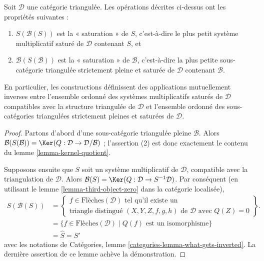 \begin{lemma}
\label{lemma-operations}
Soit $\mathcal{D}$ une catégorie triangulée. Les opérations décrites ci-dessus
ont les propriétés suivantes :
\begin{enumerate}
\item $S(\mathcal{B}(S))$ est la « saturation » de $S$, c'est-à-dire le plus
petit système multiplicatif saturé de $\mathcal{D}$ contenant $S$, et
\item $\mathcal{B}(S(\mathcal{B}))$ est la « saturation » de $\mathcal{B}$,
c'est-à-dire la plus petite sous-catégorie triangulée strictement pleine et
saturée de $\mathcal{D}$ contenant $\mathcal{B}$.
\end{enumerate}
En particulier, les constructions définissent des applications mutuellement
inverses entre l'ensemble ordonné des systèmes multiplicatifs saturés de
$\mathcal{D}$ compatibles avec la structure triangulée de $\mathcal{D}$ et
l'ensemble ordonné
des sous-catégories triangulées strictement pleines et saturées de
$\mathcal{D}$.
\end{lemma}

\begin{proof}
Partons d'abord d'une sous-catégorie triangulée pleine $\mathcal{B}$. Alors
$\mathcal{B}(S(\mathcal{B})) =
\Ker(Q : \mathcal{D} \to \mathcal{D}/\mathcal{B})$ ; l'assertion (2) est donc
exactement le contenu du lemme \ref{lemma-kernel-quotient}.

\medskip\noindent
Supposons ensuite que $S$ soit un système multiplicatif de $\mathcal{D}$,
compatible avec la triangulation de $\mathcal{D}$. Alors
$\mathcal{B}(S) = \Ker(Q : \mathcal{D} \to S^{-1}\mathcal{D})$.
Par conséquent (en utilisant le lemme \ref{lemma-third-object-zero} dans la
catégorie localisée),
\begin{align*}
S(\mathcal{B}(S))
& =
\left\{
\begin{matrix}
f \in \text{Flèches}(\mathcal{D})
\text{ tel qu'il existe un}\\
\text{triangle distingué }(X, Y, Z, f, g, h) \text{ de }\mathcal{D}\text{ avec }Q(Z) = 0
\end{matrix}
\right\}.
\\
& =
\{f \in \text{Flèches}(\mathcal{D}) \mid Q(f)\text{ est un isomorphisme}\} \\
& = \hat S = S'
\end{align*}
avec les notations de Catégories, lemme
\ref{categories-lemma-what-gets-inverted}.
La dernière assertion de ce lemme achève la démonstration.
\end{proof}

